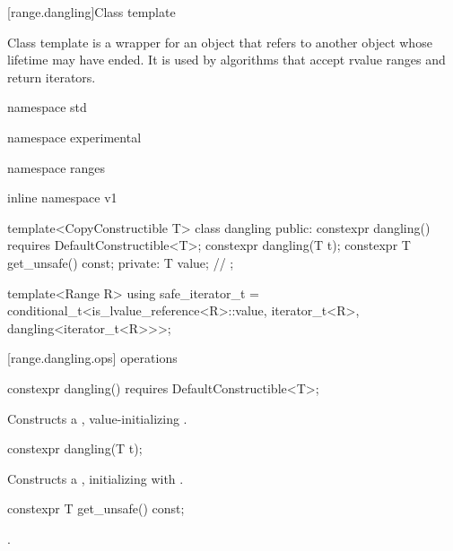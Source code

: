 {{\color{oldclr}
[range.dangling]{Class template }

\pnum
{}%
Class template  is a wrapper for an object that refers to another object whose
lifetime may have ended. It is used by algorithms that accept rvalue ranges and return iterators.

\begin{codeblock}
namespace std { namespace experimental { namespace ranges { inline namespace v1 {
  template<CopyConstructible T>
  class dangling {
  public:
    constexpr dangling() requires DefaultConstructible<T>;
    constexpr dangling(T t);
    constexpr T get_unsafe() const;
  private:
    T value; // \expos
  };

  template<Range R>
  using safe_iterator_t =
    conditional_t<is_lvalue_reference<R>::value,
      iterator_t<R>,
      dangling<iterator_t<R>>>;
}}}}
\end{codeblock}

[range.dangling.ops]{ operations}

%
\begin{itemdecl}
constexpr dangling() requires DefaultConstructible<T>;
\end{itemdecl}

\begin{itemdescr}
\pnum
\effects Constructs a , value-initializing .
\end{itemdescr}

%
\begin{itemdecl}
constexpr dangling(T t);
\end{itemdecl}

\begin{itemdescr}
\pnum
\effects
Constructs a , initializing  with .
\end{itemdescr}

%
%
\begin{itemdecl}
constexpr T get_unsafe() const;
\end{itemdecl}

\begin{itemdescr}
\pnum
\returns {}.
\end{itemdescr}
} %


}
